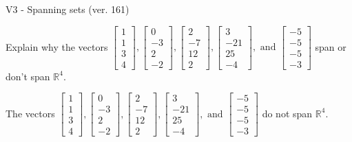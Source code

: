 \begin{exercise}
  \begin{exerciseTitle}V3 - Spanning sets (ver. 161)\end{exerciseTitle}
  \begin{exerciseStatement}
    Explain why the vectors \(\left[\begin{array}{r}
1 \\
1 \\
3 \\
4
\end{array}\right] , \left[\begin{array}{r}
0 \\
-3 \\
2 \\
-2
\end{array}\right] , \left[\begin{array}{r}
2 \\
-7 \\
12 \\
2
\end{array}\right] , \left[\begin{array}{r}
3 \\
-21 \\
25 \\
-4
\end{array}\right] , \text{ and } \left[\begin{array}{r}
-5 \\
-5 \\
-5 \\
-3
\end{array}\right]\) span or don't span \(\mathbb{R}^4\). 
	


  \end{exerciseStatement}
  \begin{exerciseAnswer}
   The vectors \(\left[\begin{array}{r}
1 \\
1 \\
3 \\
4
\end{array}\right] , \left[\begin{array}{r}
0 \\
-3 \\
2 \\
-2
\end{array}\right] , \left[\begin{array}{r}
2 \\
-7 \\
12 \\
2
\end{array}\right] , \left[\begin{array}{r}
3 \\
-21 \\
25 \\
-4
\end{array}\right] , \text{ and } \left[\begin{array}{r}
-5 \\
-5 \\
-5 \\
-3
\end{array}\right]\) 
  	 do not  
	span \(\mathbb{R}^4\).
  



\end{exerciseAnswer}
\end{exercise}
